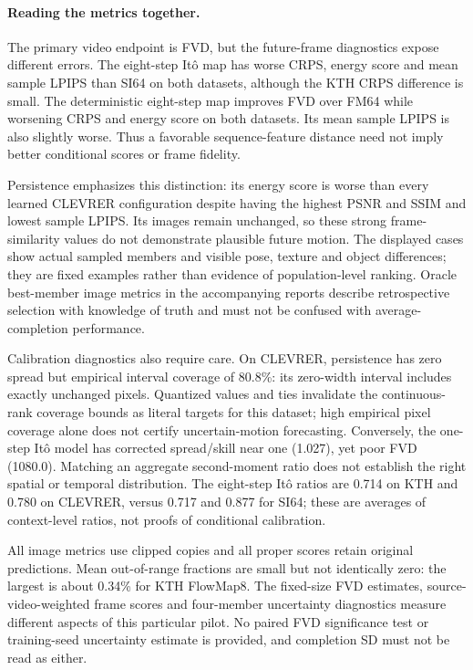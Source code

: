 \paragraph{Reading the metrics together.}
The primary video endpoint is FVD, but the future-frame diagnostics expose different errors. The eight-step It\^o map has worse CRPS, energy score and mean sample LPIPS than SI64 on both datasets, although the KTH CRPS difference is small. The deterministic eight-step map improves FVD over FM64 while worsening CRPS and energy score on both datasets. Its mean sample LPIPS is also slightly worse. Thus a favorable sequence-feature distance need not imply better conditional scores or frame fidelity.

Persistence emphasizes this distinction: its energy score is worse than every learned CLEVRER configuration despite having the highest PSNR and SSIM and lowest sample LPIPS. Its images remain unchanged, so these strong frame-similarity values do not demonstrate plausible future motion. The displayed cases show actual sampled members and visible pose, texture and object differences; they are fixed examples rather than evidence of population-level ranking. Oracle best-member image metrics in the accompanying reports describe retrospective selection with knowledge of truth and must not be confused with average-completion performance.

Calibration diagnostics also require care. On CLEVRER, persistence has zero spread but empirical interval coverage of 80.8\%: its zero-width interval includes exactly unchanged pixels. Quantized values and ties invalidate the continuous-rank coverage bounds as literal targets for this dataset; high empirical pixel coverage alone does not certify uncertain-motion forecasting. Conversely, the one-step It\^o model has corrected spread/skill near one (1.027), yet poor FVD (1080.0). Matching an aggregate second-moment ratio does not establish the right spatial or temporal distribution. The eight-step It\^o ratios are 0.714 on KTH and 0.780 on CLEVRER, versus 0.717 and 0.877 for SI64; these are averages of context-level ratios, not proofs of conditional calibration.

All image metrics use clipped copies and all proper scores retain original predictions. Mean out-of-range fractions are small but not identically zero: the largest is about 0.34\% for KTH FlowMap8. The fixed-size FVD estimates, source-video-weighted frame scores and four-member uncertainty diagnostics measure different aspects of this particular pilot. No paired FVD significance test or training-seed uncertainty estimate is provided, and completion SD must not be read as either.
